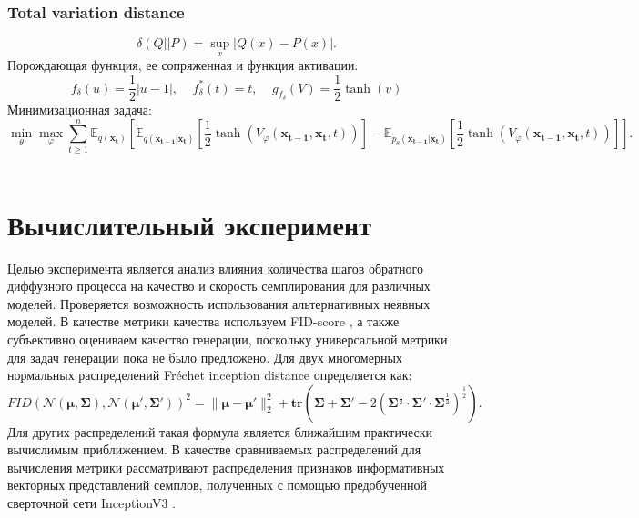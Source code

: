 \documentclass{article}
\begin{document}
\subsubsection{Total variation distance}
\begin{equation}
	\delta (Q||P) = \sup\limits_x|Q(x) - P(x)|.
\end{equation}
Порождающая функция, ее сопряженная и функция активации:
\begin{equation}
	f_{\delta}(u) = \frac{1}{2}|u-1|, ~~~~~ f^*_{\delta}(t) = t, ~~~~~ g_{f_{\delta}}(V) = \frac{1}{2}\tanh{(v)}
\end{equation}
Минимизационная задача:
\begin{equation}
	\min\limits_\theta\max\limits_\varphi\sum\limits_{t\geqslant 1}^n \mathbb{E}_{q(\mathbf{x_t})}\left[\mathbb{E}_{q(\mathbf{x_{t-1}}|\mathbf{x_t})}\left[\frac{1}{2}\tanh{(V_\varphi(\mathbf{x_{t-1}}, \mathbf{x_t}, t))}\right] - \mathbb{E}_{p_\theta(\mathbf{x_{t-1}}|\mathbf{x_t})}\left[\frac{1}{2}\tanh{(V_\varphi(\mathbf{x_{t-1}}, \mathbf{x_t}, t))}\right]\right].
\end{equation}\\



 \section{Вычислительный эксперимент}
Целью эксперимента является анализ влияния количества шагов обратного диффузного процесса на качество и скорость семплирования для различных моделей. Проверяется возможность использования альтернативных неявных моделей. В качестве метрики качества используем FID-score \cite{https://doi.org/10.48550/arxiv.1706.08500}, а также субъективно оцениваем качество генерации, поскольку универсальной метрики для задач генерации пока не было предложено. Для двух многомерных нормальных распределений Fréchet inception distance определяется как:
 \begin{equation}
	FID({\mathcal {N}}(\mathbf{\mu},\mathbf{\Sigma}),{\mathcal {N}}(\mathbf{\mu} ',\mathbf{\Sigma} '))^{2}=\lVert \mathbf{\mu} -\mathbf{\mu} '\rVert _{2}^{2}+\mathbf{tr} \left(\mathbf{\Sigma} +\mathbf{\Sigma} '-2\left(\mathbf{\Sigma} ^{\frac {1}{2}}\cdot \mathbf{\Sigma} '\cdot \mathbf{\Sigma} ^{\frac {1}{2}}\right)^{\frac {1}{2}}\right).
\end{equation}
Для других распределений такая формула является ближайшим практически вычислимым приближением. В качестве сравниваемых распределений для вычисления метрики рассматривают распределения признаков информативных векторных представлений семплов, полученных с помощью предобученной сверточной сети InceptionV3 \cite{szegedy2015rethinking}.
\end{document}
